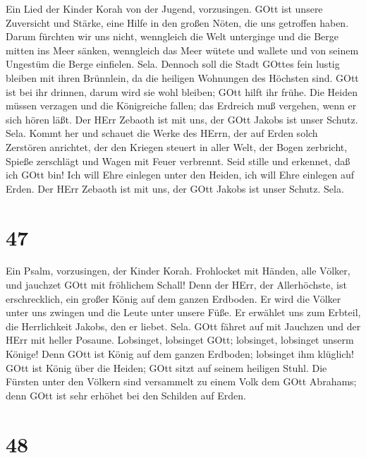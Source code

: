  Ein Lied der Kinder Korah von der Jugend, vorzusingen.
 GOtt ist unsere Zuversicht und Stärke, eine Hilfe in den
großen Nöten, die uns getroffen haben.  Darum fürchten wir
uns nicht, wenngleich die Welt unterginge und die Berge mitten ins Meer
sänken,  wenngleich das Meer wütete und wallete und von
seinem Ungestüm die Berge einfielen. Sela.  Dennoch soll die
Stadt GOttes fein lustig bleiben mit ihren Brünnlein, da die heiligen
Wohnungen des Höchsten sind.  GOtt ist bei ihr drinnen,
darum wird sie wohl bleiben; GOtt hilft ihr frühe.  Die
Heiden müssen verzagen und die Königreiche fallen; das Erdreich muß
vergehen, wenn er sich hören läßt.  Der HErr Zebaoth ist mit
uns, der GOtt Jakobs ist unser Schutz. Sela.  Kommt her und
schauet die Werke des HErrn, der auf Erden solch Zerstören anrichtet,
 der den Kriegen steuert in aller Welt, der Bogen
zerbricht, Spieße zerschlägt und Wagen mit Feuer verbrennt.
 Seid stille und erkennet, daß ich GOtt bin! Ich will Ehre
einlegen unter den Heiden, ich will Ehre einlegen auf Erden.
 Der HErr Zebaoth ist mit uns, der GOtt Jakobs ist unser
Schutz. Sela.

\hypertarget{section-46}{%
\section{47}\label{section-46}}

 Ein Psalm, vorzusingen, der Kinder Korah. 
Frohlocket mit Händen, alle Völker, und jauchzet GOtt mit fröhlichem
Schall!  Denn der HErr, der Allerhöchste, ist erschrecklich,
ein großer König auf dem ganzen Erdboden.  Er wird die
Völker unter uns zwingen und die Leute unter unsere Füße. 
Er erwählet uns zum Erbteil, die Herrlichkeit Jakobs, den er liebet.
Sela.  GOtt fähret auf mit Jauchzen und der HErr mit heller
Posaune.  Lobsinget, lobsinget GOtt; lobsinget, lobsinget
unserm Könige!  Denn GOtt ist König auf dem ganzen Erdboden;
lobsinget ihm klüglich!  GOtt ist König über die Heiden;
GOtt sitzt auf seinem heiligen Stuhl.  Die Fürsten unter
den Völkern sind versammelt zu einem Volk dem GOtt Abrahams; denn GOtt
ist sehr erhöhet bei den Schilden auf Erden.

\hypertarget{section-47}{%
\section{48}\label{section-47}}

